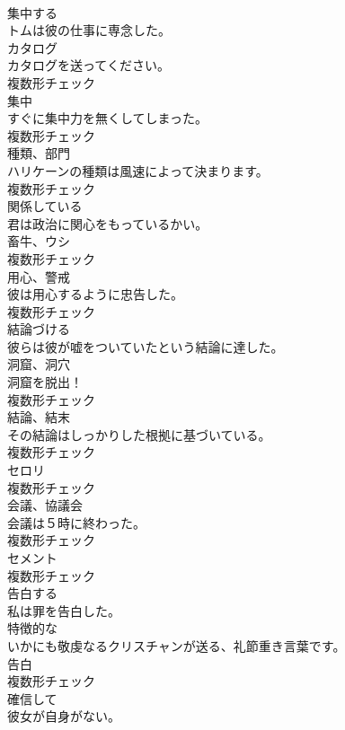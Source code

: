 \documentclass[8pt]{extreport}
\begin{document}
\begin{CJK}{UTF8}{min}
\\	[動詞]	集中する	
\\	トムは彼の仕事に専念した。	
\\	[名詞]	カタログ	
\\	カタログを送ってください。	
\\	複数形チェック
\\	[名詞]	集中	
\\	すぐに集中力を無くしてしまった。	
\\	複数形チェック
\\	[名詞]	種類、部門	
\\	ハリケーンの種類は風速によって決まります。	
\\	複数形チェック
\\	[形容詞]	関係している	
\\	君は政治に関心をもっているかい。	
\\	[名詞]	畜牛、ウシ	
\\	複数形チェック
\\	[名詞]	用心、警戒	
\\	彼は用心するように忠告した。	
\\	複数形チェック
\\	[動詞]	結論づける	
\\	彼らは彼が嘘をついていたという結論に達した。	
\\	[名詞]	洞窟、洞穴	
\\	洞窟を脱出！	
\\	複数形チェック
\\	[名詞]	結論、結末	
\\	その結論はしっかりした根拠に基づいている。	
\\	複数形チェック
\\	[名詞]	セロリ	
\\	複数形チェック
\\	[名詞]	会議、協議会	
\\	会議は５時に終わった。	
\\	複数形チェック
\\	[名詞]	セメント	
\\	複数形チェック
\\	[動詞]	告白する	
\\	私は罪を告白した。	
\\	[形容詞]	特徴的な	
\\	いかにも敬虔なるクリスチャンが送る、礼節重き言葉です。	
\\	[名詞]	告白	
\\	複数形チェック
\\	[形容詞]	確信して	
\\	彼女が自身がない。	

\end{CJK}
\end{document}
